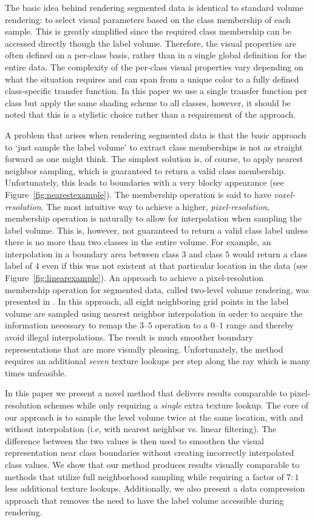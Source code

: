 \documentclass{egpubl}
\begin{document}
The basic idea behind rendering segmented data is identical to standard volume rendering: to select visual parameters based on the class membership of each sample. This is greatly simplified since the required class membership can be accessed directly though the label volume. Therefore, the visual properties are often defined on a per-class basis, rather than in a single global definition for the entire data. The complexity of the per-class visual properties vary depending on what the situation requires and can span from a unique color to a fully defined class-specific transfer function. In this paper we use a single transfer function per class but apply the same shading scheme to all classes, however, it should be noted that this is a stylistic choice rather than a requirement of the approach.

A problem that arises when rendering segmented data is that the basic approach to `just sample the label volume' to extract class memberships is not as straight forward as one might think. The simplest solution is, of course, to apply nearest neighbor sampling, which is guaranteed to return a valid class membership. Unfortunately, this leads to boundaries with a very blocky appearance (see Figure~\ref{fig:nearestexample}). The membership operation is said to have \emph{voxel-resolution}. The most intuitive way to achieve a higher, \emph{pixel-resolution}, membership operation is naturally to allow for interpolation when sampling the label volume. This is, however, not guaranteed to return a valid class label unless there is no more than two classes in the entire volume. For example, an interpolation in a boundary area between class $3$ and class $5$ would return a class label of $4$ even if this was not existent at that particular location in the data (see Figure~\ref{fig:linearexample}). An approach to achieve a pixel-resolution membership operation for segmented data, called two-level volume rendering, was presented in \cite{Hadwiger2003}. In this approach, all eight neighboring grid points in the label volume are sampled using nearest neighbor interpolation in order to acquire the information necessary to remap the $3$--$5$ operation to a $0$--$1$ range and thereby avoid illegal interpolations. The result is much smoother boundary representations that are more visually pleasing. Unfortunately, the method requires an additional \emph{seven} texture lookups per step along the ray which is many times unfeasible.

In this paper we present a novel method that delivers results comparable to pixel-resolution schemes while only requiring a \emph{single} extra texture lookup. The core of our approach is to sample the level volume twice at the same location, with and without interpolation (i.e, with nearest neighbor vs. linear filtering). The difference between the two values is then used to smoothen the visual representation near class boundaries without creating incorrectly interpolated class values. We show that our method produces results visually comparable to methods that utilize full neighborhood sampling while requiring a factor of $7:1$ less additional texture lookups. Additionally, we also present a data compression approach that removes the need to have the label volume accessible during rendering.
\end{document}
